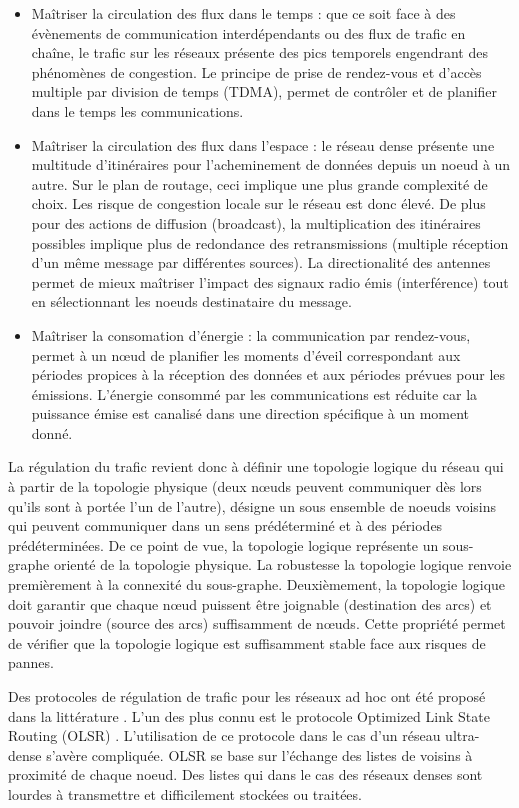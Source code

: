 \documentclass[sigconf]{acmart}
\begin{document}
\begin{itemize}
\item Maîtriser la circulation des flux dans le temps : que ce soit face à des évènements de communication interdépendants ou des flux de trafic en chaîne, le trafic sur les réseaux présente des pics temporels engendrant des phénomènes de congestion. Le principe de prise de rendez-vous et d’accès multiple par division de temps (TDMA), permet de contrôler et de planifier dans le temps les communications.
\item Maîtriser la circulation des flux dans l’espace : le réseau dense présente une multitude d’itinéraires pour l’acheminement de données depuis un noeud à un autre. Sur le plan de routage, ceci implique une plus grande complexité de choix. Les risque de congestion locale sur le réseau est donc élevé. De plus pour des actions de diffusion (broadcast), la multiplication des itinéraires possibles implique plus de redondance des retransmissions (multiple réception d’un même message par différentes sources). La directionalité des antennes permet de mieux maîtriser l'impact des signaux radio émis (interférence) tout en sélectionnant les noeuds destinataire du message. 
\item Maîtriser la consomation d'énergie : la communication par rendez-vous, permet à un nœud de planifier les moments d’éveil correspondant aux périodes propices à la réception des données et aux périodes prévues pour les émissions. L'énergie consommé par les communications est réduite car la puissance émise est canalisé dans une direction spécifique à un moment donné.
\end{itemize}

La régulation du trafic revient donc à définir une topologie logique du réseau qui à partir de la topologie physique (deux nœuds peuvent communiquer dès lors qu'ils sont à portée l'un de l'autre), désigne un sous ensemble de noeuds voisins qui peuvent communiquer dans un sens prédéterminé et à des périodes prédéterminées. De ce point de vue, la topologie logique représente un sous-graphe orienté de la topologie physique. La robustesse la topologie logique renvoie premièrement à la connexité du sous-graphe. Deuxièmement, la topologie logique doit garantir que chaque nœud puissent être joignable (destination des arcs) et pouvoir joindre (source des arcs) suffisamment de nœuds. Cette propriété permet de vérifier que la topologie logique est suffisamment stable face aux risques de pannes. 

Des protocoles de régulation de trafic pour les réseaux ad hoc ont été proposé dans la littérature \cite{oslr}. L'un des plus connu est le protocole Optimized Link State Routing (OLSR) \cite{olsr}. L'utilisation de ce protocole dans le cas d'un réseau ultra-dense s'avère compliquée. OLSR se base sur l'échange des listes de voisins à proximité de chaque noeud. Des listes qui dans le cas des réseaux denses sont lourdes à transmettre et difficilement stockées ou traitées. 
\end{document}
